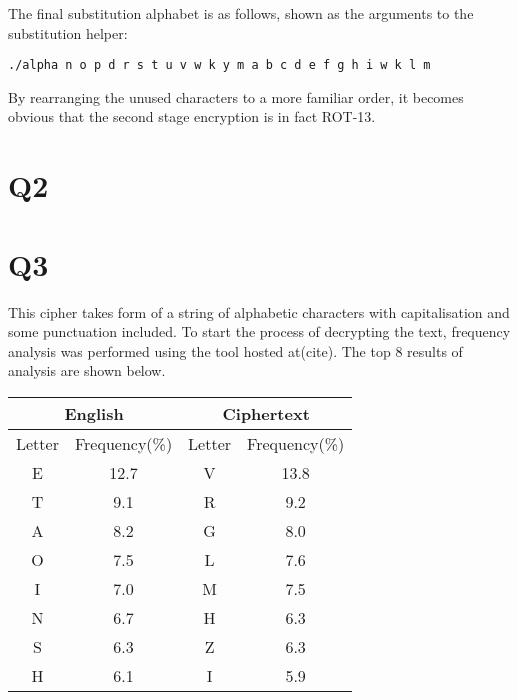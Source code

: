 \documentclass[pdflatex, a4paper,12pt]{article}
\begin{document}
\begin{quote}
    
\end{quote}

The final substitution alphabet is as follows, shown as the arguments to the
substitution helper:

\begin{verbatim}
./alpha n o p d r s t u v w k y m a b c d e f g h i w k l m
\end{verbatim}
By rearranging the unused characters to a more familiar order, it becomes
obvious that the second stage encryption is in fact ROT-13.

\section{Q2}
\section{Q3}

This cipher takes form of a string of alphabetic characters with capitalisation
and some punctuation included. To start the process of decrypting the text, frequency
analysis was performed using the tool hosted at(cite). The top 8 results of
analysis are shown below.

\begin{center}
\begin{tabular}{cc|cc}
    \multicolumn{2}{c|}{English} & \multicolumn{2}{c}{Ciphertext} \\
    \hline
    Letter & Frequency(\%) & Letter & Frequency(\%) \\
    \hline
    E                & 12.7         & V      & 13.8  \\
    T                & 9.1          & R      & 9.2   \\
    A                & 8.2          & G      & 8.0   \\
    O                & 7.5          & L      & 7.6   \\
    I                & 7.0          & M      & 7.5   \\
    N                & 6.7          & H      & 6.3   \\
    S                & 6.3          & Z      & 6.3   \\
    H                & 6.1          & I      & 5.9   \\
\end{tabular}
\end{center}
\end{document}
